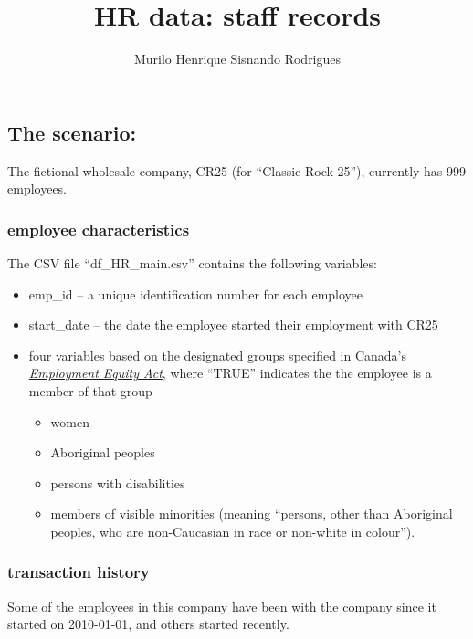 \documentclass[
]{article}
\title{HR data: staff records}
\author{Murilo Henrique Sisnando Rodrigues}
\date{}
\begin{document}
\maketitle

\hypertarget{the-scenario}{%
\subsection{The scenario:}\label{the-scenario}}

The fictional wholesale company, CR25 (for ``Classic Rock 25''),
currently has 999 employees.

\hypertarget{employee-characteristics}{%
\subsubsection{employee
characteristics}\label{employee-characteristics}}

The CSV file ``df\_HR\_main.csv'' contains the following variables:

\begin{itemize}
\item
  emp\_id -- a unique identification number for each employee
\item
  start\_date -- the date the employee started their employment with
  CR25
\item
  four variables based on the designated groups specified in Canada's
  \href{https://laws-lois.justice.gc.ca/eng/acts/E-5.401/}{\emph{Employment
  Equity Act}}, where ``TRUE'' indicates the the employee is a member of
  that group

  \begin{itemize}
  \item
    women
  \item
    Aboriginal peoples
  \item
    persons with disabilities
  \item
    members of visible minorities (meaning ``persons, other than
    Aboriginal peoples, who are non-Caucasian in race or non-white in
    colour'').
  \end{itemize}
\end{itemize}

\hypertarget{transaction-history}{%
\subsubsection{transaction history}\label{transaction-history}}

Some of the employees in this company have been with the company since
it started on 2010-01-01, and others started recently.
\end{document}
